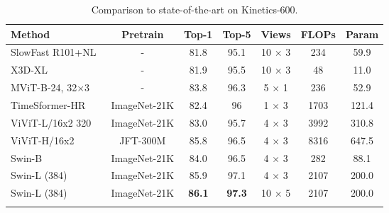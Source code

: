 \documentclass{article}
\newcommand{\demph}[1]{\textcolor[rgb]{0.565,0.565,0.565}{#1}}
\begin{document}
\begin{table}[t]
\caption{Comparison to state-of-the-art on Kinetics-600.}
\centering
  \begin{tabular}{l|c|cc|c|cc}
\Xhline{1.0pt}
  Method & Pretrain & Top-1 & Top-5 & Views & FLOPs & Param  \\
  \hline
  SlowFast R101+NL~\cite{feichtenhofer2019slowfast} & - & 81.8 & 95.1 & 10 × 3 & 234 & 59.9 \\
  X3D-XL~\cite{feichtenhofer2020x3d} & - & 81.9 & 95.5 & 10 × 3 & 48 & 11.0 \\
  MViT-B-24, 32×3~\cite{mvit2021} & - & 83.8 & 96.3 & 5 × 1 & 236 & 52.9 \\
TimeSformer-HR~\cite{timesformer2021} & ImageNet-21K & 82.4 & 96 & 1 × 3 & 1703 & 121.4\\
  ViViT-L/16x2 320~\cite{arnab2021vivit} & ImageNet-21K & 83.0 & 95.7 & 4 × 3 & 3992& 310.8\\
\demph{ViViT-H/16x2~\cite{mvit2021}} & \demph{JFT-300M} & \demph{85.8} & \demph{96.5} & \demph{4 × 3} &\demph{8316} & \demph{647.5} \\
  \hline
  Swin-B & ImageNet-21K & 84.0 & 96.5 & 4 × 3 & 282 & 88.1\\
  Swin-L (384) & ImageNet-21K & {85.9} & {97.1} & 4 × 3 & 2107 & 200.0 \\
  Swin-L (384) & ImageNet-21K & \textbf{86.1} & \textbf{97.3} & 10 × 5 & 2107 & 200.0   \\
\Xhline{1.0pt}
  \end{tabular}
\label{tab:k600}
\end{table}
\end{document}
